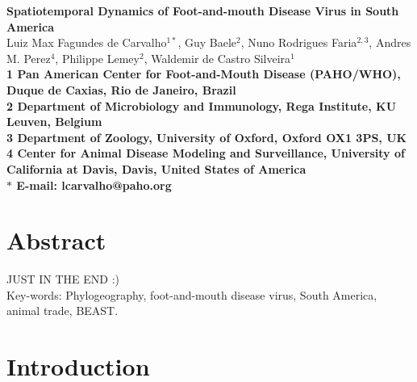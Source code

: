 \documentclass[10pt]{article}
\date{}
\begin{document}
\begin{flushleft}
{\Large
\textbf{Spatiotemporal Dynamics of Foot-and-mouth Disease Virus in South America}
}
\\
Luiz Max Fagundes de Carvalho$^{1\ast}$,
Guy Baele$^{2}$,
Nuno Rodrigues Faria$^{2,3}$,
Andres M. Perez$^{4}$,
Philippe Lemey$^{2}$,
Waldemir de Castro Silveira$^{1}$
\\
\bf{1} Pan American Center for Foot-and-Mouth Disease (PAHO/WHO), Duque de Caxias, Rio de Janeiro, Brazil
\\
\bf{2} Department of Microbiology and Immunology, Rega Institute, KU Leuven, Belgium
\\
\bf{3} Department of Zoology, University of Oxford, Oxford OX1 3PS, UK
\\
\bf{4} Center for Animal Disease Modeling and Surveillance, University of California at Davis, Davis, United States of America
\\
$\ast$ E-mail: lcarvalho@paho.org
\end{flushleft}

\section*{Abstract}

JUST IN THE END :)\\

Key-words: Phylogeography, foot-and-mouth disease virus, South America, animal trade, BEAST.

\section*{Introduction}
\end{document}
